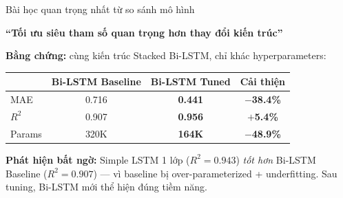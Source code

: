 \documentclass[11pt]{beamer}
\begin{document}
\begin{frame}{Bài học quan trọng nhất từ so sánh mô hình}
\small

\begin{center}
\large\textbf{``Tối ưu siêu tham số quan trọng hơn thay đổi kiến trúc''}
\end{center}

\vspace{0.2cm}
\textbf{Bằng chứng:} cùng kiến trúc Stacked Bi-LSTM, chỉ khác hyperparameters:

\begin{table}[h]
\centering
\begin{tabular}{lccc}
\toprule
& \textbf{Bi-LSTM Baseline} & \textbf{Bi-LSTM Tuned} & \textbf{Cải thiện} \\
\midrule
MAE & 0.716 & \textbf{0.441} & \textcolor{breakthroughgreen}{\textbf{$-$38.4\%}} \\
$R^2$ & 0.907 & \textbf{0.956} & \textcolor{breakthroughgreen}{\textbf{$+$5.4\%}} \\
Params & 320K & \textbf{164K} & \textcolor{breakthroughgreen}{\textbf{$-$48.9\%}} \\
\bottomrule
\end{tabular}
\end{table}

\vspace{0.1cm}
\textbf{Phát hiện bất ngờ:} Simple LSTM 1 lớp ($R^2=0.943$) \textit{tốt hơn} Bi-LSTM Baseline ($R^2=0.907$) --- vì baseline bị over-parameterized + underfitting. Sau tuning, Bi-LSTM mới thể hiện đúng tiềm năng.

\vspace{0.1cm}
\end{frame}
\end{document}

